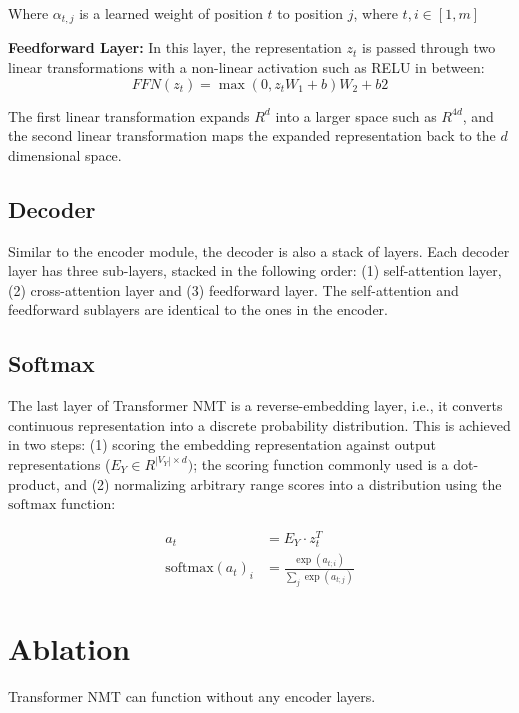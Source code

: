 Where $\alpha_{t,j}$ is a learned weight of position $t$ to position $j$, where $t, i \in [1, m]$


\textbf{Feedforward Layer:}
 In this layer, the representation $z_t$ is passed through two linear transformations with a non-linear activation such as RELU in between:
 $$FFN(z_t) = \max(0, z_t W_1  + b) W_2 + b2 $$
 
The first linear transformation expands $R^d$ into a larger space such as $R^{4d}$, and the second linear transformation maps the expanded representation back to the $d$ dimensional space.

\subsection{Decoder}
Similar to the encoder module, the decoder is also a stack of layers.
Each decoder layer has three sub-layers, stacked in the following order: (1) self-attention layer, (2) cross-attention layer and (3) feedforward layer. 
The self-attention and feedforward sublayers are identical to the ones in the encoder. 

\subsection{Softmax}

The last layer of Transformer NMT is a reverse-embedding layer, i.e., it converts continuous representation into a discrete probability distribution.
This is achieved in two steps: 
(1) scoring the embedding representation against output representations ($E_Y \in R^{|V_Y| \times d})$; the scoring function commonly used is a dot-product, and (2) normalizing arbitrary range scores into a distribution using the $\text{softmax}$ function:

\begin{align*}
  a_t &= E_Y \cdot z_t^T \\
 \text{softmax}(a_t)_i &= \frac {\exp(a{_{t;i}})} {\sum_j \exp(a_{t;j}) }
\end{align*}



\section{Ablation}

Transformer NMT can function without any encoder layers.
 

